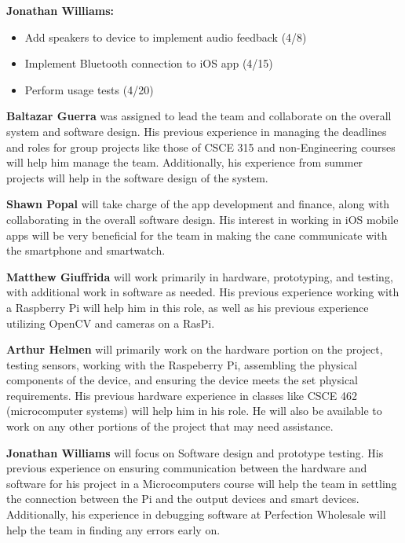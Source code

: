 \documentclass[letterpaper,12pt]{article}
\begin{document}
\textbf{Jonathan Williams:}
\begin{itemize}
    \item Add speakers to device to implement audio feedback (4/8)
    \item Implement Bluetooth connection to iOS app (4/15)
    \item Perform usage tests (4/20)
\end{itemize}

\textbf{Baltazar Guerra} was assigned to lead the team and collaborate on the overall system and software design. His previous experience in managing the deadlines and roles for group projects like those of CSCE 315 and non-Engineering courses will help him manage the team. Additionally, his experience from summer projects will help in the software design of the system. \par

\textbf{Shawn Popal} will take charge of the app development and finance, along with collaborating in the overall software design. His interest in working in iOS mobile apps will be very beneficial for the team in making the cane communicate with the smartphone and smartwatch.

\textbf{Matthew Giuffrida} will work primarily in hardware, prototyping, and testing, with additional work in software as needed. His previous experience working with a Raspberry Pi will help him in this role, as well as his previous experience utilizing OpenCV and cameras on a RasPi. \par

\textbf{Arthur Helmen} will primarily work on the hardware portion on the project, testing sensors, working with the Raspeberry Pi,  assembling the physical components of the device, and ensuring the device meets the set physical requirements. His previous hardware experience in classes like CSCE 462 (microcomputer systems) will help him in his role. He will also be available to work on any other portions of the project that may need assistance. \par

\textbf{Jonathan Williams} will focus on Software design and prototype testing. His previous experience on ensuring communication between the hardware and software for his project in a Microcomputers course will help the team in settling the connection between the Pi and the output devices and smart devices. Additionally, his experience in debugging software at Perfection Wholesale will help the team in finding any errors early on.
\end{document}
